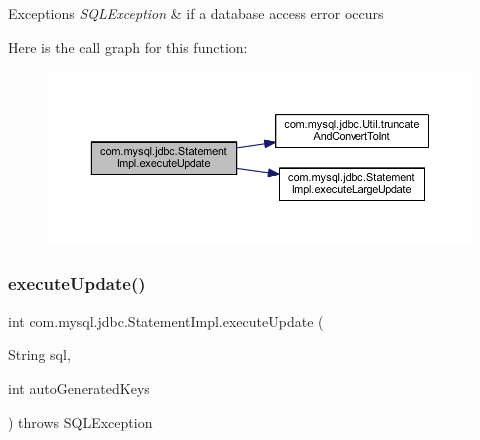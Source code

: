 \begin{DoxyExceptions}{Exceptions}
{\em S\+Q\+L\+Exception} & if a database access error occurs \\
\hline
\end{DoxyExceptions}
Here is the call graph for this function\+:
\nopagebreak
\begin{figure}[H]
\begin{center}
\leavevmode
\includegraphics[width=350pt]{classcom_1_1mysql_1_1jdbc_1_1_statement_impl_aa968966221a50357d4ed7f2d72a94bf6_cgraph}
\end{center}
\end{figure}
\mbox{\label{classcom_1_1mysql_1_1jdbc_1_1_statement_impl_ab13499dab119bd6814990fb5c64b3463}} 
\subsubsection{\texorpdfstring{execute\+Update()}{executeUpdate()}\hspace{0.1cm}{\footnotesize\ttfamily [2/4]}}
{\footnotesize\ttfamily int com.\+mysql.\+jdbc.\+Statement\+Impl.\+execute\+Update (\begin{DoxyParamCaption}\item[{String}]{sql,  }\item[{int}]{auto\+Generated\+Keys }\end{DoxyParamCaption}) throws S\+Q\+L\+Exception}

